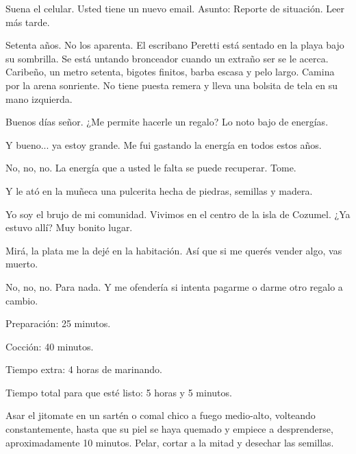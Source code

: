 \documentclass[12pt,twoside,openright,a5paper]{book}
\begin{document}
Suena el celular. Usted tiene un nuevo email. Asunto: Reporte de situación. Leer más tarde.


\vspace{0.5cm}

\hrulefill\hspace{0.2cm} \decofourleft\decofourright \hspace{0.2cm} \hrulefill
\vspace{0.5cm}

Setenta años. No los aparenta. El escribano Peretti está sentado en la
playa bajo  su sombrilla. Se está untando bronceador cuando un extraño ser
se le acerca.  Caribeño, un metro setenta, bigotes finitos, barba escasa
y pelo largo. Camina por la arena sonriente. No
tiene puesta remera y lleva una bolsita de tela en su mano izquierda.

Buenos días señor. ¿Me permite hacerle un regalo? Lo noto bajo de
energías.

Y bueno... ya estoy grande. Me fui gastando la energía en todos estos años.

No, no, no. La energía que a usted le falta se puede recuperar. Tome.

Y le ató en la muñeca una pulcerita hecha de piedras, semillas y madera.

Yo soy el brujo de mi comunidad. Vivimos en el centro de la isla de
Cozumel. ¿Ya estuvo allí? Muy bonito lugar.

Mirá, la plata me la dejé en la habitación. Así que si me querés vender
algo, vas muerto.

No, no, no. Para nada. Y me ofendería si intenta pagarme o darme otro
regalo a cambio.

\vspace{0.5cm}

\hrulefill\hspace{0.2cm} \decofourleft\decofourright \hspace{0.2cm} \hrulefill
\vspace{0.5cm}

Preparación: 25 minutos.

Cocción: 40 minutos.

Tiempo extra: 4 horas de marinando.

Tiempo total para que esté listo: 5 horas y 5 minutos.

Asar el jitomate en un sartén o comal chico a fuego medio-alto, volteando
constantemente, hasta que su piel se haya quemado y empiece a desprenderse,
aproximadamente 10 minutos. Pelar, cortar a la mitad y desechar las semillas.
\end{document}
